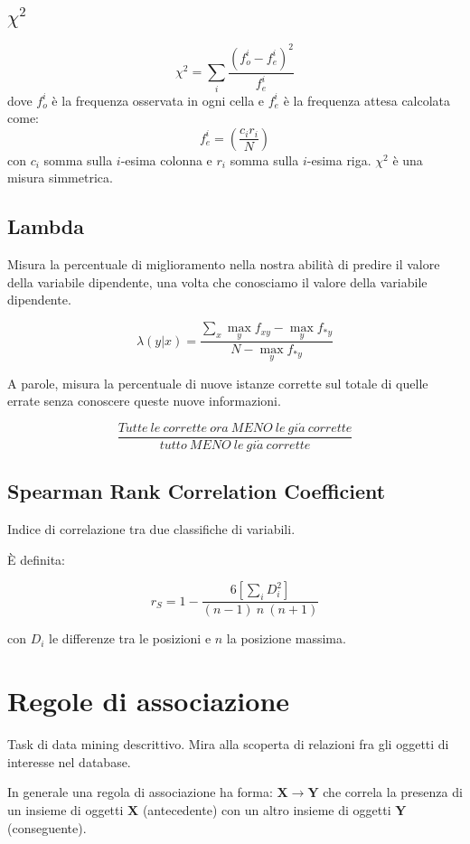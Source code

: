 \documentclass[11pt,onecolumn,a4paper,oneside]{book}
\begin{document}
\subsection{$\chi^2$}
$$\chi^2 = \sum_i \frac{\left( f_o^i - f_e^i \right)^2}{f_e^i}$$
dove $f_o^i$ è la frequenza osservata in ogni cella e $f_e^i$ è la frequenza attesa calcolata come:
$$f_e^i = \left( \frac{c_i r_i}{N} \right)$$
con $c_i$ somma sulla $i$-esima colonna e $r_i$ somma sulla $i$-esima riga.
$\chi^2$ è una misura simmetrica.

\subsection{Lambda}
Misura la percentuale di miglioramento nella nostra abilità di predire il valore della variabile dipendente, una volta che conosciamo il valore della variabile dipendente.

$$\lambda(y|x) = \frac{\sum_x \max\limits_y f_{xy}-\max\limits_y f_{*y}}{N-\max\limits_y f_{*y}} $$

A parole, misura la percentuale di nuove istanze corrette sul totale di quelle errate senza conoscere queste nuove informazioni.

$$\frac{Tutte~le ~corrette ~ora~ MENO~ le~ gi\acute{a}~ corrette}{tutto~ MENO~ le~ gi\acute{a}~ corrette}$$

\subsection{Spearman Rank Correlation Coefficient}
Indice di correlazione tra due classifiche di variabili.

È definita:

$$ r_S = 1 - \frac{6\left[ \sum\limits_i D^2_i \right]}{\left( n -1 \right) ~ n ~ \left( n+1 \right)} $$

con $D_i$ le differenze tra le posizioni e $n$ la posizione massima.

	\section{Regole di associazione}
	Task di data mining descrittivo. Mira alla scoperta di relazioni fra gli oggetti di interesse nel database.
	
	In generale una regola di associazione ha forma:
	$\textbf{X} \rightarrow \mathbf{Y}$ che correla la presenza di un insieme di oggetti $\textbf{X}$ (antecedente) con un altro insieme di oggetti $\textbf{Y}$ (conseguente).
	
\end{document}
